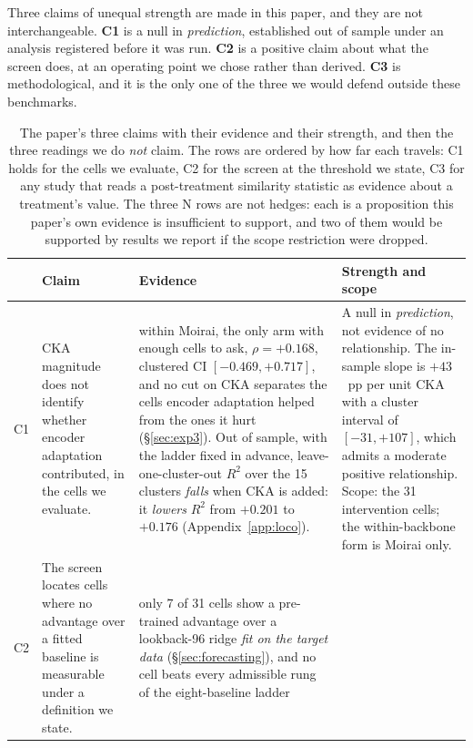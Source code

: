 Three claims of unequal strength are made in this paper, and they are not
interchangeable.  \textbf{C1} is a null in \emph{prediction}, established out of
sample under an analysis registered before it was run.  \textbf{C2} is a positive
claim about what the screen does, at an operating point we chose rather than
derived.  \textbf{C3} is methodological, and it is the only one of the three we
would defend outside these benchmarks.

\begin{table}[ht]
\centering\small
\caption{The paper's three claims with their evidence and their strength, and then
the three readings we do \emph{not} claim.  The rows are ordered by how far each
travels: C1 holds for the cells we evaluate, C2 for the screen at the threshold we
state, C3 for any study that reads a post-treatment similarity statistic as
evidence about a treatment's value.  The three N rows are not hedges: each is a
proposition this paper's own evidence is insufficient to support, and two of them
would be supported by results we report if the scope restriction were dropped.}
\label{tab:claims}
\begin{tabular}{@{}p{}p{}p{}p{}@{}}
\toprule
& Claim & Evidence & Strength and scope \\
\midrule
C1 & CKA magnitude does not identify whether encoder adaptation
     contributed, in the cells we evaluate.
   & within Moirai, the only arm with enough cells to ask, $\rho{=}{+}0.168$,
     clustered CI $[-0.469,{+}0.717]$, and no cut on CKA separates the cells
     encoder adaptation helped from the ones it hurt
     (\S\ref{sec:exp3}).  Out of sample, with the ladder fixed in advance,
     leave-one-cluster-out $R^2$ over the 15 clusters \emph{falls} when CKA is
     added: it \emph{lowers} $R^2$ from $+0.201$ to $+0.176$
     (Appendix~\ref{app:loco}).
   & A null in \emph{prediction}, not evidence of no relationship.  The
     in-sample slope is $+43$~pp per unit CKA with a cluster interval of
     $[-31, +107]$, which admits a moderate positive relationship.  Scope: the 31
     intervention cells; the within-backbone form is Moirai only. \\
\addlinespace
C2 & The screen locates cells where no advantage over a fitted baseline is
     measurable under a definition we state.
   & only 7 of 31 cells show a pre-trained advantage over a lookback-96 ridge
     \emph{fit on the target data} (\S\ref{sec:forecasting}), and no cell beats
     every admissible rung of the eight-baseline ladder

\end{tabular}
\end{table}
